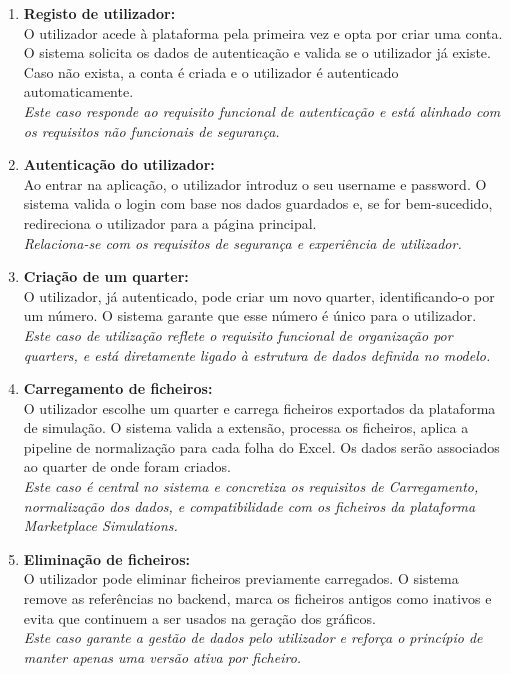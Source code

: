 \begin{enumerate}
    \item \textbf{Registo de utilizador: } \\
    O utilizador acede à plataforma pela primeira vez e opta por criar uma conta. O sistema solicita os dados de autenticação e valida se o utilizador já existe. Caso não exista, a conta é criada e o utilizador é autenticado automaticamente. \\
    \textit{Este caso responde ao requisito funcional de autenticação e está alinhado com os requisitos não funcionais de segurança.}
    
    \item \textbf{Autenticação do utilizador: } \\
    Ao entrar na aplicação, o utilizador introduz o seu username e password. O sistema valida o login com base nos dados guardados e, se for bem-sucedido, redireciona o utilizador para a página principal. \\
    \textit{Relaciona-se com os requisitos de segurança e experiência de utilizador.}
    
    \item \textbf{Criação de um quarter: } \\
    O utilizador, já autenticado, pode criar um novo quarter, identificando-o por um número. O sistema garante que esse número é único para o utilizador. \\
    \textit{Este caso de utilização reflete o requisito funcional de organização por quarters, e está diretamente ligado à estrutura de dados definida no modelo.}
    
    \item \textbf{Carregamento de ficheiros: } \\
    O utilizador escolhe um quarter e carrega ficheiros exportados da plataforma de simulação. O sistema valida a extensão, processa os ficheiros, aplica a pipeline de normalização para cada folha do Excel. Os dados serão associados ao quarter de onde foram criados. \\
    \textit{Este caso é central no sistema e concretiza os requisitos de Carregamento, normalização dos dados, e compatibilidade com os ficheiros da plataforma Marketplace Simulations.}

    \item \textbf{Eliminação de ficheiros: } \\
    O utilizador pode eliminar ficheiros previamente carregados. O sistema remove as referências no backend, marca os ficheiros antigos como inativos e evita que continuem a ser usados na geração dos gráficos. \\
    \textit{Este caso garante a gestão de dados pelo utilizador e reforça o princípio de manter apenas uma versão ativa por ficheiro.}
    

\end{enumerate}
